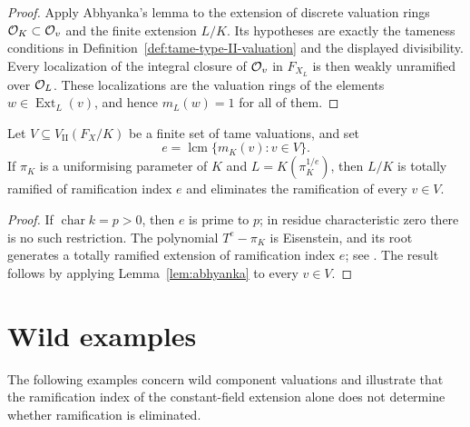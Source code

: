 \begin{proof}
    Apply Abhyanka's lemma to the extension of discrete valuation rings $\mathcal O_K\subset\mathcal{O}_v$ and the finite extension $L/K$.
    Its hypotheses are exactly the tameness conditions in Definition~\ref{def:tame-type-II-valuation} and the displayed divisibility.
    Every localization of the integral closure of $\mathcal{O}_v$ in $F_{X_L}$ is then weakly unramified over $\mathcal O_L$.
    These localizations are the valuation rings of the elements $w\in\operatorname{Ext}_L(v)$, and hence $m_L(w)=1$ for all of them.
\end{proof}

\begin{corollary}\label{cor:abhyanka-finite-set}
    Let $V\subseteq V_\mathrm{II}(F_X/K)$ be a finite set of tame valuations, and set
    \[
        e=\operatorname{lcm}\{m_K(v):v\in V\}.
    \]
    If $\pi_K$ is a uniformising parameter of $K$ and $L=K(\pi_K^{1/e})$, then $L/K$ is totally ramified of ramification index $e$ and eliminates the ramification of every $v\in V$.
\end{corollary}

\begin{proof}
    If $\operatorname{char}k=p>0$, then $e$ is prime to $p$; in residue characteristic zero there is no such restriction.
    The polynomial $T^e-\pi_K$ is Eisenstein, and its root generates a totally ramified extension of ramification index $e$; see \cite[\href{https://stacks.math.columbia.edu/tag/09EV}{Lemma 15.116.2}]{Stacks}.
    The result follows by applying Lemma~\ref{lem:abhyanka} to every $v\in V$.
\end{proof}

\section{Wild examples}\label{sec:tame-and-wild-examples}

The following examples concern wild component valuations and illustrate that the ramification index of the constant-field extension alone does not determine whether ramification is eliminated.

